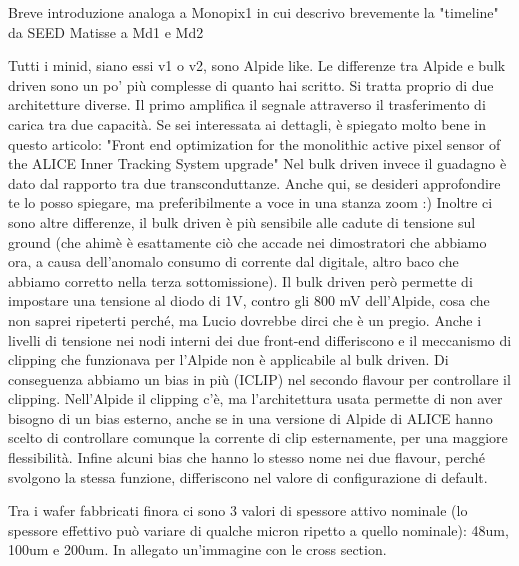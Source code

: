 \cite{ARCADIA-Pancheri}
\cite{ARCADIA-Pancheri2}

Breve introduzione analoga a Monopix1 in cui descrivo brevemente la "timeline" da SEED Matisse a Md1 e Md2

Tutti i minid, siano essi v1 o v2, sono Alpide like.
Le differenze tra Alpide e bulk driven sono un po' più complesse di quanto
hai scritto.
Si tratta proprio di due architetture diverse.
Il primo amplifica il segnale attraverso il trasferimento di carica tra
due capacità.
Se sei interessata ai dettagli, è spiegato molto bene in questo articolo:
"Front end optimization for the monolithic active pixel sensor of the
ALICE Inner Tracking System upgrade"
Nel bulk driven invece il guadagno è dato dal rapporto tra due
transconduttanze. Anche qui, se desideri approfondire te lo posso
spiegare, ma preferibilmente a voce in una stanza zoom :)
Inoltre ci sono altre differenze, il bulk driven è più sensibile alle
cadute di tensione sul ground (che ahimè è esattamente ciò che accade nei
dimostratori che abbiamo ora, a causa dell'anomalo consumo di corrente dal
digitale, altro baco che abbiamo corretto nella terza sottomissione).
Il bulk driven però permette di impostare una tensione al diodo di 1V,
contro gli 800 mV dell'Alpide, cosa che non saprei ripeterti perché, ma
Lucio dovrebbe dirci che è un pregio.
Anche i livelli di tensione nei nodi interni dei due front-end
differiscono e il meccanismo di clipping che funzionava per l'Alpide non è
applicabile al bulk driven. Di conseguenza abbiamo un bias in più (ICLIP)
nel secondo flavour per controllare il clipping.
Nell'Alpide il clipping c'è, ma l'architettura usata permette di non aver
bisogno di un bias esterno, anche se in una versione di Alpide di ALICE
hanno scelto di controllare comunque la corrente di clip esternamente, per
una maggiore flessibilità.
Infine alcuni bias che hanno lo stesso nome nei due flavour, perché
svolgono la stessa funzione, differiscono nel valore di configurazione di
default.

Tra i wafer fabbricati finora ci sono 3 valori di spessore attivo nominale (lo spessore effettivo può variare 
di qualche micron ripetto a quello nominale):  48um, 100um e 200um. In allegato un'immagine
con le cross section.


